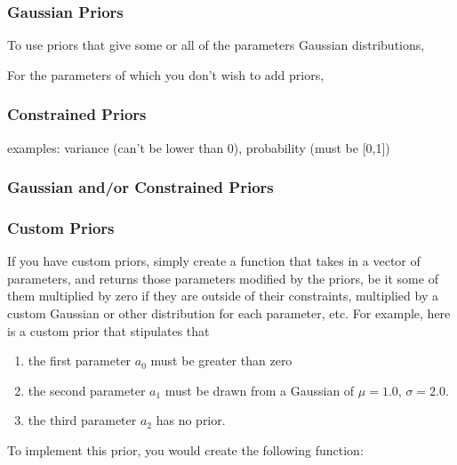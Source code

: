 \documentclass[12pt]{article}
\begin{document}
\subsubsection{Gaussian Priors}
To use priors that give some or all of the parameters Gaussian distributions, 

\par For the parameters of which you don't wish to add priors, 
\subsubsection{Constrained Priors}
examples: variance (can't be lower than 0), probability (must be [0,1])
\subsubsection{Gaussian and/or Constrained Priors}
\subsubsection{Custom Priors}
\par If you have custom priors, simply create a function that takes in a vector of parameters, and returns those parameters modified by the priors, be it some of them multiplied by zero if they are outside of their constraints, multiplied by a custom Gaussian or other distribution for each parameter, etc. For example, here is a custom prior that stipulates that
\begin{enumerate}
	\item the first parameter $a_0$ must be greater than zero
	\item the second parameter $a_1$ must be drawn from a Gaussian of $\mu = 1.0$, $\sigma = 2.0$.
	\item the third parameter $a_2$ has no prior.
\end{enumerate}
To implement this prior, you would create the following function:
\end{document}
